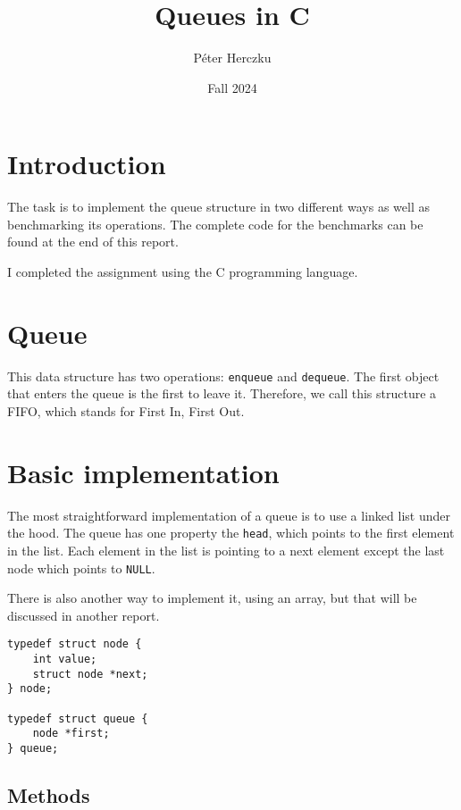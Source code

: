 \documentclass[a4paper,11pt]{article}
\begin{document}
    \title{
        \textbf{Queues in C}
    }
    \author{Péter Herczku}
    \date{Fall 2024}

    \maketitle

    \section*{Introduction}

    The task is to implement the queue structure in two different ways as well as benchmarking its operations.
    The complete code for the benchmarks can be found at the end of this report.

    I completed the assignment using the C programming language.

    \section*{Queue}

    This data structure has two operations: {\tt enqueue} and {\tt dequeue}.
    The first object that enters the queue is the first to leave it.
    Therefore, we call this structure a FIFO, which stands for First In, First Out.

    \section*{Basic implementation}

    The most straightforward implementation of a queue is to use a linked list under the hood.
    The queue has one property the {\tt head}, which points to the first element in the list.
    Each element in the list is pointing to a next element except the last node which points to {\tt NULL}.

    There is also another way to implement it, using an array, but that will be discussed in another report.

    \begin{verbatim}
typedef struct node {
    int value;
    struct node *next;
} node;

typedef struct queue {
    node *first;
} queue;
    \end{verbatim}

    \subsection*{Methods}
\end{document}
